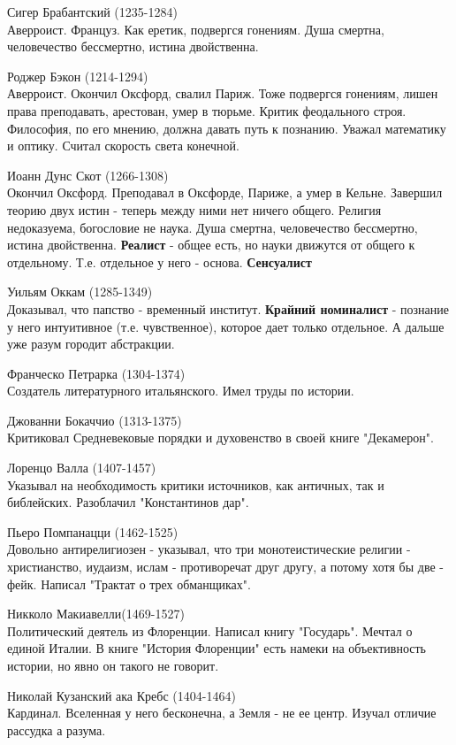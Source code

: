 \documentclass[12pt,a4paper]{article}
\begin{document}
Сигер Брабантский (1235-1284)\\
Аверроист. Француз. Как еретик, подвергся гонениям. Душа смертна, человечество бессмертно, истина двойственна.
 
Роджер Бэкон (1214-1294)\\ 
Аверроист. Окончил Оксфорд, свалил  Париж. Тоже подвергся гонениям, лишен права преподавать, арестован, умер в тюрьме. Критик феодального строя. Философия, по его мнению, должна давать путь к познанию. Уважал математику и оптику. Считал скорость света конечной.

Иоанн Дунс Скот (1266-1308)\\
Окончил Оксфорд. Преподавал в Оксфорде, Париже, а умер в Кельне. Завершил теорию двух истин - теперь между ними нет ничего общего. Религия недоказуема, богословие не наука. Душа смертна, человечество бессмертно, истина двойственна. \textbf{Реалист} - общее есть, но науки движутся от общего к отдельному. Т.е. отдельное у  него - основа. \textbf{Сенсуалист}
 
Уильям Оккам (1285-1349)\\
Доказывал, что папство - временный институт. \textbf{Крайний номиналист} - познание у него интуитивное (т.е. чувственное), которое дает только отдельное. А дальше уже разум городит абстракции.

Франческо Петрарка (1304-1374)\\
Создатель литературного итальянского. Имел труды по истории.

Джованни Бокаччио (1313-1375)\\ 
Критиковал Средневековые порядки и духовенство в своей книге "Декамерон". 

Лоренцо Валла (1407-1457)\\
Указывал на необходимость критики источников, как античных, так и библейских. Разоблачил "Константинов дар".

Пьеро Помпанацци (1462-1525)\\
Довольно антирелигиозен - указывал, что три монотеистические религии - христианство, иудаизм, ислам - противоречат друг другу, а потому хотя бы две -  фейк. Написал "Трактат о трех обманщиках".

Никколо Макиавелли(1469-1527)\\
Политический деятель из Флоренции. Написал книгу "Государь". Мечтал о единой Италии. В книге "История Флоренции" есть намеки на объективность истории, но явно он такого не говорит.

Николай Кузанский ака Кребс (1404-1464)\\
Кардинал. Вселенная у него бесконечна, а Земля - не ее центр. Изучал отличие рассудка а разума.
\end{document}

